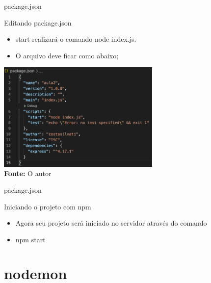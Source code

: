 \documentclass{beamer}
\begin{document}
    \begin{frame}[label=lists]{package.json}
		\begin{exampleblock}{Editando package.json}
	\begin{itemize}
	\item start realizará o comando \alert{node index.js}.
	\item O arquivo deve ficar como abaixo;
	\end{itemize}
	\end{exampleblock}
	 \includegraphics[width=80mm]{resources/aula3_3.png}\\
            \tiny{\textbf{Fonte:} O autor}

    \end{frame}
   
    \begin{frame}[label=lists]{package.json}
		\begin{exampleblock}{Iniciando o projeto com npm}
	\begin{itemize}
	\item Agora seu projeto será iniciado no servidor através do comando
	\item \alert{npm start}
	\end{itemize}
	\end{exampleblock}
    \end{frame}
 \section{nodemon}
\end{document}
